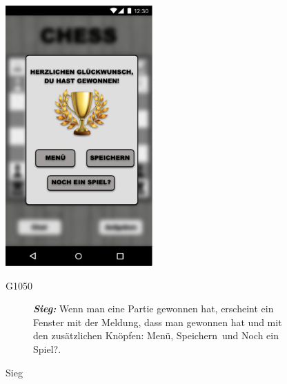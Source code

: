 \documentclass[parskip=full]{scrartcl}
\begin{document}
\begin{figure}[htp]
	\begin{minipage}[t]{6cm}
		\vspace{0pt}
		\includegraphics[height=100mm]{Sieg.png}
		\caption{Sieg}
		\label{fig:Sieg}
	\end{minipage}
	\hfill
	\begin{minipage}[t]{6cm}
		\vspace{0pt}
		\begin{description}
			\item[G1050] \textbf{\textit{Sieg: }} Wenn man eine Partie gewonnen hat, erscheint ein Fenster mit der Meldung, dass man gewonnen hat und mit den zusätzlichen Knöpfen: \glqq Menü\grqq, \glqq Speichern\grqq\ und \glqq Noch ein Spiel?\grqq.
		\end{description}
	\end{minipage}


\end{figure}
\end{document}
